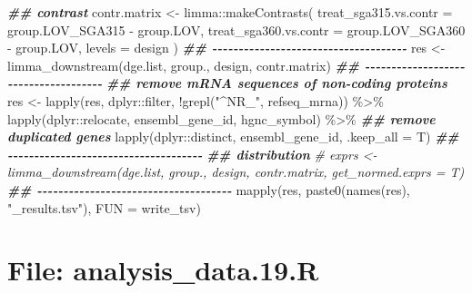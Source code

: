 \documentclass[
]{article}
\newenvironment{Shaded}{\begin{snugshade}}{\end{snugshade}}
\newcommand{\AttributeTok}[1]{\textcolor[rgb]{0.77,0.63,0.00}{#1}}
\newcommand{\CommentTok}[1]{\textcolor[rgb]{0.56,0.35,0.01}{\textit{#1}}}
\newcommand{\DocumentationTok}[1]{\textcolor[rgb]{0.56,0.35,0.01}{\textbf{\textit{#1}}}}
\newcommand{\FunctionTok}[1]{\textcolor[rgb]{0.00,0.00,0.00}{#1}}
\newcommand{\NormalTok}[1]{#1}
\newcommand{\OtherTok}[1]{\textcolor[rgb]{0.56,0.35,0.01}{#1}}
\newcommand{\SpecialCharTok}[1]{\textcolor[rgb]{0.00,0.00,0.00}{#1}}
\newcommand{\StringTok}[1]{\textcolor[rgb]{0.31,0.60,0.02}{#1}}
\begin{document}
\begin{Shaded}
\begin{Highlighting}[]
\DocumentationTok{\#\# contrast}
\NormalTok{contr.matrix }\OtherTok{\textless{}{-}}\NormalTok{ limma}\SpecialCharTok{::}\FunctionTok{makeContrasts}\NormalTok{(}
  \AttributeTok{treat\_sga315.vs.contr =}\NormalTok{ group.LOV\_SGA315 }\SpecialCharTok{{-}}\NormalTok{ group.LOV,}
  \AttributeTok{treat\_sga360.vs.contr =}\NormalTok{ group.LOV\_SGA360 }\SpecialCharTok{{-}}\NormalTok{ group.LOV,}
  \AttributeTok{levels =}\NormalTok{ design}
\NormalTok{)}
\DocumentationTok{\#\# {-}{-}{-}{-}{-}{-}{-}{-}{-}{-}{-}{-}{-}{-}{-}{-}{-}{-}{-}{-}{-}{-}{-}{-}{-}{-}{-}{-}{-}{-}{-}{-}{-}{-}{-}{-}{-} }
\NormalTok{res }\OtherTok{\textless{}{-}} \FunctionTok{limma\_downstream}\NormalTok{(dge.list, group., design, contr.matrix)}
\DocumentationTok{\#\# {-}{-}{-}{-}{-}{-}{-}{-}{-}{-}{-}{-}{-}{-}{-}{-}{-}{-}{-}{-}{-}{-}{-}{-}{-}{-}{-}{-}{-}{-}{-}{-}{-}{-}{-}{-}{-} }
\DocumentationTok{\#\# remove mRNA sequences of non{-}coding proteins}
\NormalTok{res }\OtherTok{\textless{}{-}} \FunctionTok{lapply}\NormalTok{(res, dplyr}\SpecialCharTok{::}\NormalTok{filter, }\SpecialCharTok{!}\FunctionTok{grepl}\NormalTok{(}\StringTok{"\^{}NR\_"}\NormalTok{, refseq\_mrna)) }\SpecialCharTok{\%\textgreater{}\%} 
  \FunctionTok{lapply}\NormalTok{(dplyr}\SpecialCharTok{::}\NormalTok{relocate, ensembl\_gene\_id, hgnc\_symbol) }\SpecialCharTok{\%\textgreater{}\%} 
  \DocumentationTok{\#\# remove duplicated genes}
  \FunctionTok{lapply}\NormalTok{(dplyr}\SpecialCharTok{::}\NormalTok{distinct, ensembl\_gene\_id, }\AttributeTok{.keep\_all =}\NormalTok{ T)}
\DocumentationTok{\#\# {-}{-}{-}{-}{-}{-}{-}{-}{-}{-}{-}{-}{-}{-}{-}{-}{-}{-}{-}{-}{-}{-}{-}{-}{-}{-}{-}{-}{-}{-}{-}{-}{-}{-}{-}{-}{-} }
\DocumentationTok{\#\# distribution}
\CommentTok{\# exprs \textless{}{-} limma\_downstream(dge.list, group., design, contr.matrix, get\_normed.exprs = T)}
\DocumentationTok{\#\# {-}{-}{-}{-}{-}{-}{-}{-}{-}{-}{-}{-}{-}{-}{-}{-}{-}{-}{-}{-}{-}{-}{-}{-}{-}{-}{-}{-}{-}{-}{-}{-}{-}{-}{-}{-}{-} }
\FunctionTok{mapply}\NormalTok{(res, }\FunctionTok{paste0}\NormalTok{(}\FunctionTok{names}\NormalTok{(res), }\StringTok{"\_results.tsv"}\NormalTok{), }\AttributeTok{FUN =}\NormalTok{ write\_tsv)}
\end{Highlighting}
\end{Shaded}

\hypertarget{file-analysis_data.19.r}{%
\section{File: analysis\_data.19.R}\label{file-analysis_data.19.r}}
\end{document}

